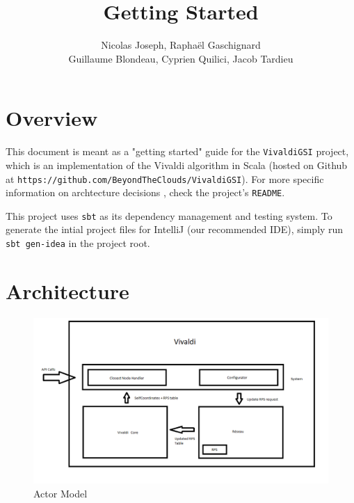 \documentclass[11pt,a4paper]{article}
\title{Getting Started}
\author{Nicolas Joseph, Raphaël Gaschignard\\ Guillaume Blondeau, Cyprien Quilici, Jacob Tardieu}
\begin{document}
\maketitle

\section{Overview}
  This document is meant as a "getting started" guide for the \texttt{VivaldiGSI} project, which is an implementation of the Vivaldi algorithm in Scala (hosted on Github at \verb|https://github.com/BeyondTheClouds/VivaldiGSI|). For more specific information on archtecture decisions , check the project's \verb|README|.
  
    This project uses \verb|sbt| as its dependency management and testing system. To generate the intial project files for IntelliJ (our recommended IDE), simply run \verb|sbt gen-idea| in the project root.
    
\section{Architecture}

\begin{figure}[h]
   \includegraphics[scale=0.4]{VivaldiArchitecture}
   \caption{\label{acteur} Actor Model}
\end{figure}
\end{document}
